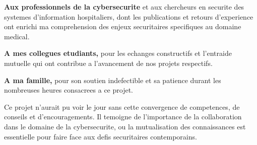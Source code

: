 \textbf{Aux professionnels de la cybersecurite} et aux chercheurs en securite des systemes d'information hospitaliers, dont les publications et retours d'experience ont enrichi ma comprehension des enjeux securitaires specifiques au domaine medical.

\vspace{0.5cm}

\textbf{A mes collegues etudiants,} pour les echanges constructifs et l'entraide mutuelle qui ont contribue a l'avancement de nos projets respectifs.

\vspace{0.5cm}
\clearpage

\textbf{A ma famille,} pour son soutien indefectible et sa patience durant les nombreuses heures consacrees a ce projet.

\vspace{0.5cm}
Ce projet n'aurait pu voir le jour sans cette convergence de competences, de conseils et d'encouragements. Il temoigne de l'importance de la collaboration dans le domaine de la cybersecurite, ou la mutualisation des connaissances est essentielle pour faire face aux defis securitaires contemporains.

\vspace{1cm}


\newpage
